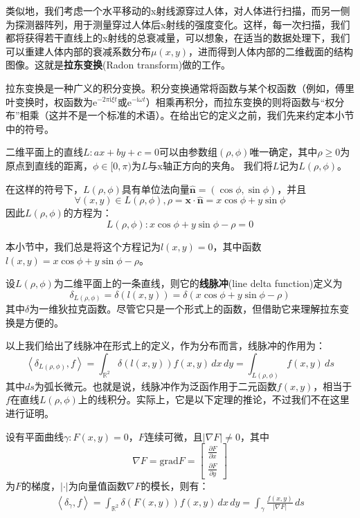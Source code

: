 \documentclass{ctexbook}
\begin{document}
类似地，我们考虑一个水平移动的x射线源穿过人体，对人体进行扫描，而另一侧为探测器阵列，用于测量穿过人体后x射线的强度变化。这样，每一次扫描，我们都将获得若干直线上的x射线的总衰减量，可以想象，在适当的数据处理下，我们可以重建人体内部的衰减系数分布$\mu(x,y)$，进而得到人体内部的二维截面的结构图像。这就是\textbf{拉东变换}(Radon transform)做的工作。

拉东变换是一种广义的积分变换。积分变换通常将函数与某个权函数（例如，傅里叶变换时，权函数为$\mathrm{e}^{-2\pi \mathrm{i}\xi t}$或$\mathrm{e}^{-\mathrm{i}\omega t}$）相乘再积分，而拉东变换的则将函数与“权分布”相乘（这并不是一个标准的术语）。在给出它的定义之前，我们先来约定本小节中的符号。

\begin{definition}[二位平面上的直线系]
    二维平面上的直线$L:ax+by+c=0$可以由参数组$(\rho,\phi)$唯一确定，其中$\rho\geq 0$为原点到直线的距离，$\phi\in[0,\pi)$为$L$与x轴正方向的夹角。
    我们将$L$记为$L(\rho,\phi)$。
\end{definition}

在这样的符号下，$L(\rho,\phi)$具有单位法向量$\hat{\mathbf{n}}=(\cos\phi,\sin\phi)$，并且$$\forall (x,y)\in L(\rho,\phi),\rho=\mathbf{x}\cdot\hat{\mathbf{n}}=x\cos\phi+y\sin\phi$$
因此$L(\rho,\phi)$的方程为：
\[L(\rho,\phi): x\cos\phi+y\sin\phi-\rho=0\]

本小节中，我们总是将这个方程记为$l(x,y)=0$，其中函数$l(x,y)=x\cos\phi+y\sin\phi-\rho$。

\begin{definition}[线脉冲]
    设$L(\rho,\phi)$为二维平面上的一条直线，则它的\textbf{线脉冲}(line delta function)定义为
    \[\delta_{L(\rho,\phi)}=\delta(l(x,y))=\delta(x\cos\phi+y\sin\phi-\rho)\]
    其中$\delta$为一维狄拉克函数。尽管它只是一个形式上的函数，但借助它来理解拉东变换是方便的。
\end{definition}

以上我们给出了线脉冲在形式上的定义，作为分布而言，线脉冲的作用为：
\[\left\langle \delta_{L(\rho,\phi)},f\right\rangle=\int_{\mathbb{R}^2}\delta(l(x,y))f(x,y)\,dx\,dy=\int_{L(\rho,\phi)}f(x,y)\,ds\]
其中$ds$为弧长微元。也就是说，线脉冲作为泛函作用于二元函数$f(x,y)$，相当于$f$在直线$L(\rho,\phi)$上的线积分。实际上，它是以下定理的推论，不过我们不在这里进行证明。
\begin{claim}
    设有平面曲线$\gamma:F(x,y)=0$，$F$连续可微，且$|\nabla F|\neq 0$，其中
    \[\nabla F=\text{grad}F=\begin{bmatrix}
        \frac{\partial F}{\partial x}\\
        \frac{\partial F}{\partial y}        
    \end{bmatrix}\]
    为$F$的梯度，$|\cdot|$为向量值函数$\nabla F$的模长，则有：
    \begin{align*}
        \left\langle \delta_{\gamma},f\right\rangle=\int_{\mathbb{R}^2}\delta(F(x,y))f(x,y)\,dx\,dy=\int_{\gamma}\frac{f(x,y)}{|\nabla F|}\,ds
    \end{align*}
\end{claim}
\end{document}
